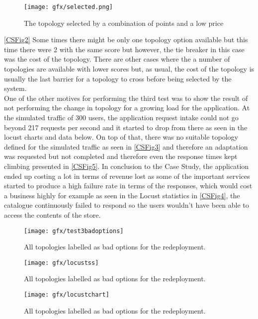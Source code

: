 \begin{figure} [H]
   \centering 
   \texttt{[image: gfx/selected.png]}
   \caption{ The topology selected by a combination of points and a low price} 
   \label{CSFig2} 
\end{figure}

\autoref{CSFig2} Some times there might be only one topology option available but this time there were 2 with the same score but however, the tie breaker in this case was the cost of the topology. There are other cases where the a number of topologies are available with lower scores but, as usual, the cost of the topology is usually the last barrier for a topology to cross before being selected by the system.\\
 
One of the other motives for performing the third test was to show the result of not performing the change in topology for a growing load for the application. At the simulated traffic of 300 users, the application request intake could not go beyond 217 requests per second and it started to drop from there as seen in the locust charts and data below. On top of that, there was no suitable topology defined for the simulated traffic as seen in \autoref{CSFig3} and therefore an adaptation was requested but not completed and therefore even the response times kept climbing presented in \autoref{CSFig5}. In conclusion to the Case Study, the application ended up costing a lot in terms of revenue lost as some of the important services started to produce a high failure rate in terms of the responses, which would cost a business highly for example as seen in the Locust statistics in \autoref{CSFig4}, the catalogue continuously failed to respond so the users wouldn't have been able to access the contents of the store.

\begin{figure} [H]
   \centering 
   \texttt{[image: gfx/test3badoptions]}
   \caption{All topologies labelled as bad options for the redeployment.} 
   \label{CSFig3} 
\end{figure}

\begin{figure} [H]
   \centering 
   \texttt{[image: gfx/locustss]}
   \caption{All topologies labelled as bad options for the redeployment.} 
   \label{CSFig4} 
\end{figure}

\begin{figure} [H]
   \centering 
   \texttt{[image: gfx/locustchart]}
   \caption{All topologies labelled as bad options for the redeployment.} 
   \label{CSFig5} 
\end{figure}

